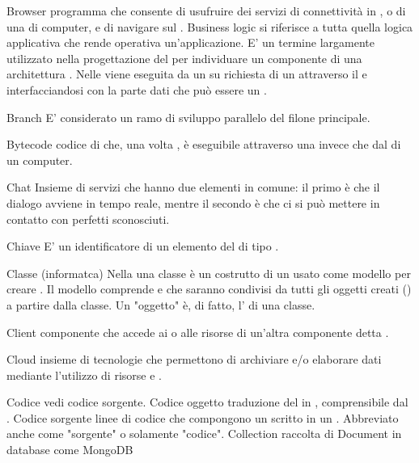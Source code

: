 \elemento
{Browser} 
{programma che consente di usufruire dei servizi di connettività in , o di una  di computer, e di navigare sul .}
\elemento
{Business logic} 
{si riferisce a tutta quella logica applicativa che rende operativa un'applicazione. E' un termine largamente utilizzato nella progettazione del  per individuare un componente  di una architettura . Nelle  viene eseguita da un  su richiesta di un  attraverso il  e interfacciandosi con la parte dati che può essere un .}

\elemento
{Branch}
{E' considerato un ramo di sviluppo parallelo del filone principale.}

\elemento
{Bytecode} 
{codice di  che, una volta , è eseguibile attraverso una  invece che dal  di un computer.}


\elemento
{Chat}
{Insieme di servizi che hanno due elementi in comune: il primo è che il dialogo avviene in tempo reale, mentre il secondo è che ci si può mettere in contatto con perfetti sconosciuti.}

\elemento
{Chiave}
{E' un identificatore di un elemento del  di tipo .}

\elemento
{Classe (informatca)}
{Nella   una classe è un costrutto di un  usato come modello per creare . Il modello comprende  e  che saranno condivisi da tutti gli oggetti creati () a partire dalla classe. Un "oggetto" è, di fatto, l' di una classe.}

\elemento
{Client} 
{componente che accede ai  o alle risorse di un'altra componente detta .} 

\elemento
{Cloud} 
{insieme di tecnologie che permettono di archiviare e/o elaborare dati mediante l'utilizzo di risorse  e .}

\elemento
{Codice} 
{vedi codice sorgente.}
\elemento
{Codice oggetto}
{traduzione del  in , comprensibile dal .}
\elemento
{Codice sorgente}
{linee di codice che compongono un  scritto in un . Abbreviato anche come "sorgente" o solamente "codice".}
\elemento
{Collection} 
{raccolta di Document in database come MongoDB}


